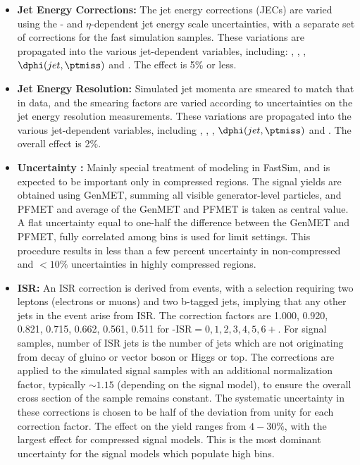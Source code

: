 \begin{itemize}
\item {\bf Jet Energy Corrections:} The jet energy corrections (JECs) are varied using the \pt-
and $\eta$-dependent jet energy scale uncertainties, with a separate set of corrections for the fast simulation samples.
These variations are propagated into the various jet-dependent variables, including: \nj, \nb, \ptmiss, $\dphi(jet,\ptmiss)$ and \ST.
The effect is 5\% or less.
\item {\bf Jet Energy Resolution:} Simulated jet momenta are smeared to match that in data, and the smearing factors are varied according to uncertainties on the jet energy resolution measurements. These variations are propagated into the various jet-dependent variables, including \nj, \nb, \ptmiss, $\dphi(jet,\ptmiss)$ and \ST. The overall effect is 2\%.
\item {\bf \ptmiss Uncertainty :} Mainly special treatment of \ptmiss modeling in FastSim, and is expected to be important only in compressed regions. The signal yields are obtained using GenMET, summing all visible generator-level particles, and PFMET and average of the GenMET and PFMET is taken as central value.  A flat uncertainty equal to one-half the difference between the GenMET and PFMET, fully correlated among \ptmiss bins is used for limit settings. This procedure results in less than a few percent uncertainty in non-compressed and $<10\%$ uncertainties in highly compressed regions.
\item {\bf ISR:} An ISR correction is derived from \ttbar events, with a selection requiring two leptons (electrons or muons) and two b-tagged jets, implying that any other jets in the event arise from ISR.
The correction factors are 1.000, 0.920, 0.821, 0.715, 0.662, 0.561, 0.511 for \nj-ISR$ = 0,1,2,3,4,5,6{+}$.
For signal samples, number of ISR jets is the number of jets which are not originating from decay of gluino or vector boson or Higgs or top.
The corrections are applied to the simulated signal samples with an additional normalization factor, typically ${\sim}1.15$ (depending on the signal model),
to ensure the overall cross section of the sample remains constant.
The systematic uncertainty in these corrections is chosen to be half of the deviation from unity for each correction factor.
The effect on the yield ranges from $4-30\%$, with the largest effect for compressed signal models. This is the most dominant uncertainty for the signal models which populate high \nj bins.
\end{itemize}

